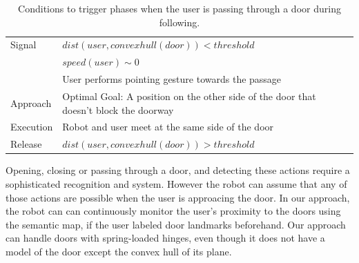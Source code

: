 \begin{table}[ht!]
	\caption{Conditions to trigger phases when the user is passing through a door during following.}
	\centering
  \begin{tabular}{l |  m{10cm}}    
    \toprule    
    Signal & {$dist(user, convexhull(door))<threshold$}\\         
    	      & {$speed(user)\sim 0$} \\
	      & {User performs pointing gesture towards the passage}\\ \midrule	                           
    Approach & {Optimal Goal: A position on the other side of the door that doesn't block the doorway}\\       \midrule
    Execution & {Robot and user meet at the same side of the door}\\  \midrule
    Release & {$dist(user, convexhull(door))>threshold$ }\\ 
    \bottomrule
  \end{tabular}
    \label{table:situation_aware_list_door}
\end{table}


Opening, closing or passing through a door, and detecting these actions require a sophisticated recognition and system. However the robot can assume that any of those actions are possible when the user is approacing the door. In our approach, the robot can can continuously monitor the user's proximity to the doors using the semantic map, if the user labeled door landmarks beforehand. Our approach can handle doors with spring-loaded hinges, even though it does not have a model of the door except the convex hull of its plane.

